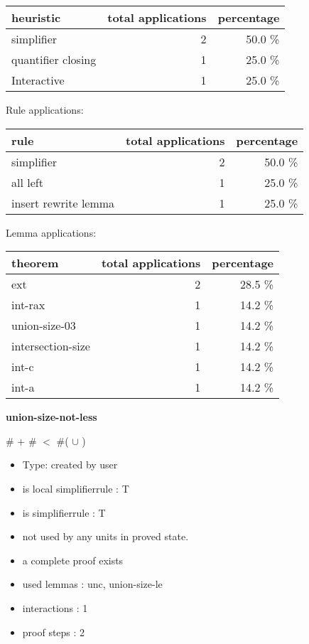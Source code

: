 \documentclass[a4paper]{article}
\begin{document}
\begin{supertabular}{l|r|r}
heuristic	& total applications & percentage \\ \hline
simplifier & 2 & 50.0 \% \\
quantifier closing & 1 & 25.0 \% \\
Interactive & 1 & 25.0 \% \\

\end{supertabular}

Rule applications:

\begin{supertabular}{l|r|r}
rule	        & total applications & percentage \\ \hline
simplifier & 2 & 50.0 \% \\
all left & 1 & 25.0 \% \\
insert rewrite lemma & 1 & 25.0 \% \\

\end{supertabular}

Lemma applications:

\begin{supertabular}{l|r|r}
theorem	        & total applications & percentage \\ \hline
ext & 2 & 28.5 \% \\
int-rax & 1 & 14.2 \% \\
union-size-03 & 1 & 14.2 \% \\
intersection-size & 1 & 14.2 \% \\
int-c & 1 & 14.2 \% \\
int-a & 1 & 14.2 \% \\

\end{supertabular}
\pagebreak

{\LARGE\bf union-size-not-less}\label{lemma-union-size-not-less}

\medskip

 \Fol \Not \#  + \#  $<$ \#( $\cup$ )

\begin{itemize}

\item Type: created by user

\item is local simplifierrule : T
\item is simplifierrule : T
\item not used by any units in proved state.
\item       a complete proof exists
\item       used lemmas  : unc, union-size-le
\item       interactions : 1
\item       proof steps  : 2
\end{itemize}
\end{document}
